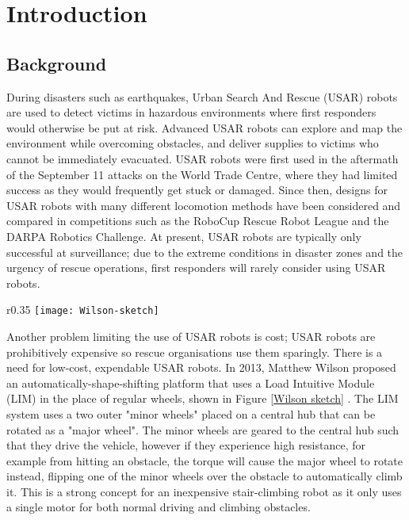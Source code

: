 \chapter{Introduction}

\section{Background}

During disasters such as earthquakes, Urban Search And Rescue (USAR) robots are used to detect victims in hazardous environments where first responders would otherwise be put at risk. Advanced USAR robots can explore and map the environment while overcoming obstacles, and deliver supplies to victims who cannot be immediately evacuated. USAR robots were first used in the aftermath of the September 11 attacks on the World Trade Centre, where they had limited success as they would frequently get stuck or damaged. Since then, designs for USAR robots with many different locomotion methods have been considered and compared in competitions such as the RoboCup Rescue Robot League and the DARPA Robotics Challenge. At present, USAR robots are typically only successful at surveillance; due to the extreme conditions in disaster zones and the urgency of rescue operations, first responders will rarely consider using USAR robots.\\

\begin{wrapfigure}{r}{0.35\textwidth} %
	\centering
	\texttt{[image: Wilson-sketch]}
	\caption{Systems layout of Wilson's LIM device \citep{Wilson-2013}}
	\label{Wilson sketch}
\end{wrapfigure}

\noindent Another problem limiting the use of USAR robots is cost; USAR robots are prohibitively expensive so rescue organisations use them sparingly. There is a need for low-cost, expendable USAR robots. In 2013, Matthew Wilson proposed an automatically-shape-shifting platform that uses a Load Intuitive Module (LIM) in the place of regular wheels, shown in Figure \ref{Wilson sketch} \citep{Wilson-2013}. The LIM system uses a two outer "minor wheels" placed on a central hub that can be rotated as a "major wheel". The minor wheels are geared to the central hub such that they drive the vehicle, however if they experience high resistance, for example from hitting an obstacle, the torque will cause the major wheel to rotate instead, flipping one of the minor wheels over the obstacle to automatically climb it. This is a strong concept for an inexpensive stair-climbing robot as it only uses a single motor for both normal driving and climbing obstacles.\\



